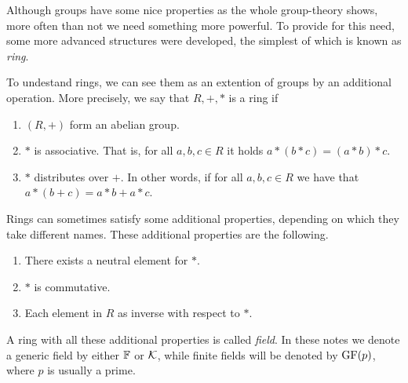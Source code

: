 \documentclass{subfiles}
\begin{document}
    Although groups have some nice properties as the whole group-theory shows,
        more often than not we need something more powerful.
        To provide for this need, some more advanced structures were developed,
        the simplest of which is known as \emph{ring}.

    To undestand rings, we can see them as an extention of groups by an additional operation.
        More precisely, we say that \(R, +, *\) is a ring if 
        \begin{enumerate}
            \item \((R, +)\) form an abelian group.
            \item \(*\) is associative. That is, for all \(a, b, c \in R\) it holds 
                \(a * (b * c) = (a * b) * c\).
            \item \(*\) distributes over \(+\). In other words,
                if for all \(a, b, c \in R\) we have that \(a * (b + c) = a * b + a * c\).
        \end{enumerate}
        
    Rings can sometimes satisfy some additional properties,
        depending on which they take different names.
        These additional properties are the following.
        \begin{enumerate}
            \item There exists a neutral element for \(*\).
            \item \(*\) is commutative.
            \item Each element in \(R\) as inverse with respect to \(*\).
        \end{enumerate}
        A ring with all these additional properties is called \emph{field}.
        In these notes we denote a generic field by either \(\mathbb{F}\) or \(\mathcal{K}\),
        while finite fields will be denoted by \(\operatorname{GF}(p)\), 
        where \(p\) is usually a prime.
\end{document}
